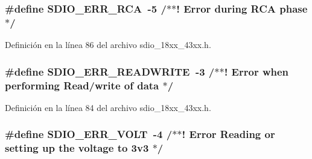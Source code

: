 \subsubsection[{\texorpdfstring{S\+D\+I\+O\+\_\+\+E\+R\+R\+\_\+\+R\+CA}{SDIO_ERR_RCA}}]{\setlength{\rightskip}{0pt plus 5cm}\#define S\+D\+I\+O\+\_\+\+E\+R\+R\+\_\+\+R\+CA~-\/5 /$\ast$$\ast$! Error during R\+CA phase $\ast$/}\hypertarget{group___s_d_i_o__18_x_x__43_x_x_ga9fa8f3cb769952116adde0a9d94213b4}{}\label{group___s_d_i_o__18_x_x__43_x_x_ga9fa8f3cb769952116adde0a9d94213b4}


Definición en la línea 86 del archivo sdio\+\_\+18xx\+\_\+43xx.\+h.

\subsubsection[{\texorpdfstring{S\+D\+I\+O\+\_\+\+E\+R\+R\+\_\+\+R\+E\+A\+D\+W\+R\+I\+TE}{SDIO_ERR_READWRITE}}]{\setlength{\rightskip}{0pt plus 5cm}\#define S\+D\+I\+O\+\_\+\+E\+R\+R\+\_\+\+R\+E\+A\+D\+W\+R\+I\+TE~-\/3 /$\ast$$\ast$! Error when performing Read/write of data $\ast$/}\hypertarget{group___s_d_i_o__18_x_x__43_x_x_ga66fa67187ef08b5e46bbbc37bc8f617a}{}\label{group___s_d_i_o__18_x_x__43_x_x_ga66fa67187ef08b5e46bbbc37bc8f617a}


Definición en la línea 84 del archivo sdio\+\_\+18xx\+\_\+43xx.\+h.

\subsubsection[{\texorpdfstring{S\+D\+I\+O\+\_\+\+E\+R\+R\+\_\+\+V\+O\+LT}{SDIO_ERR_VOLT}}]{\setlength{\rightskip}{0pt plus 5cm}\#define S\+D\+I\+O\+\_\+\+E\+R\+R\+\_\+\+V\+O\+LT~-\/4 /$\ast$$\ast$! Error Reading or setting up the voltage to 3v3 $\ast$/}\hypertarget{group___s_d_i_o__18_x_x__43_x_x_gaf48a8666f04e6fc2132bcb6ad7b72234}{}\label{group___s_d_i_o__18_x_x__43_x_x_gaf48a8666f04e6fc2132bcb6ad7b72234}


